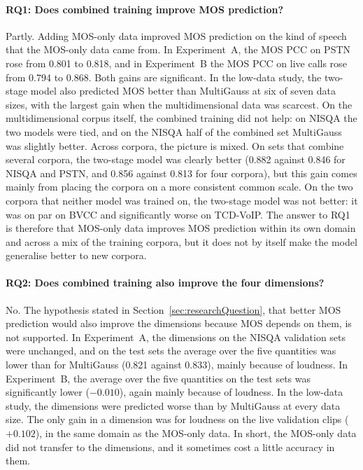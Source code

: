\documentclass[
english,                 %
bibtex,                  %
includeExtraAbstracts, %
]{kththesis}
\numberwithin{listing}{chapter}
\begin{document}
\paragraph{RQ1: Does combined training improve MOS prediction?}
Partly. Adding MOS-only data improved MOS prediction on the kind of speech that the MOS-only data came from. In Experiment~A, the MOS PCC on PSTN rose from 0.801 to 0.818, and in Experiment~B the MOS PCC on live calls rose from 0.794 to 0.868. Both gains are significant. In the low-data study, the two-stage model also predicted MOS better than MultiGauss at six of seven data sizes, with the largest gain when the multidimensional data was scarcest. On the multidimensional corpus itself, the combined training did not help: on NISQA the two models were tied, and on the NISQA half of the combined set MultiGauss was slightly better. Across corpora, the picture is mixed. On sets that combine several corpora, the two-stage model was clearly better (0.882 against 0.846 for NISQA and PSTN, and 0.856 against 0.813 for four corpora), but this gain comes mainly from placing the corpora on a more consistent common scale. On the two corpora that neither model was trained on, the two-stage model was not better: it was on par on BVCC and significantly worse on TCD-VoIP. The answer to RQ1 is therefore that MOS-only data improves MOS prediction within its own domain and across a mix of the training corpora, but it does not by itself make the model generalise better to new corpora.

\paragraph{RQ2: Does combined training also improve the four dimensions?}
No. The hypothesis stated in Section~\ref{sec:researchQuestion}, that better MOS prediction would also improve the dimensions because MOS depends on them, is not supported. In Experiment~A, the dimensions on the NISQA validation sets were unchanged, and on the test sets the average over the five quantities was lower than for MultiGauss (0.821 against 0.833), mainly because of loudness. In Experiment~B, the average over the five quantities on the test sets was significantly lower ($-0.010$), again mainly because of loudness. In the low-data study, the dimensions were predicted worse than by MultiGauss at every data size. The only gain in a dimension was for loudness on the live validation clips ($+0.102$), in the same domain as the MOS-only data. In short, the MOS-only data did not transfer to the dimensions, and it sometimes cost a little accuracy in them.
\end{document}
